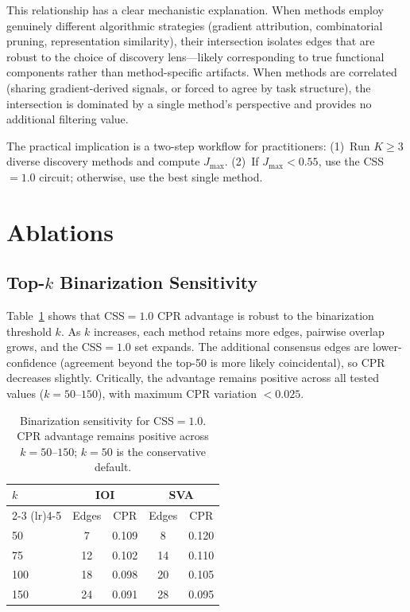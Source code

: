 \documentclass[11pt,a4paper]{article}
\newcommand{\css}{\textsc{CSS}}
\begin{document}
This relationship has a clear mechanistic explanation.
When methods employ genuinely different algorithmic strategies (gradient attribution, combinatorial pruning, representation similarity), their intersection isolates edges that are robust to the choice of discovery lens---likely corresponding to true functional components rather than method-specific artifacts.
When methods are correlated (sharing gradient-derived signals, or forced to agree by task structure), the intersection is dominated by a single method's perspective and provides no additional filtering value.

The practical implication is a two-step workflow for practitioners:
(1)~Run $K\!\ge\!3$ diverse discovery methods and compute $J_{\max}$.
(2)~If $J_{\max} < 0.55$, use the \css{}$=1.0$ circuit; otherwise, use the best single method.

\section{Ablations}

\subsection{Top-$k$ Binarization Sensitivity}
\label{sec:sensitivity}

Table~\ref{tab:sensitivity} shows that \css{}$=1.0$ CPR advantage is robust to the binarization threshold $k$.
As $k$ increases, each method retains more edges, pairwise overlap grows, and the \css{}$=1.0$ set expands.
The additional consensus edges are lower-confidence (agreement beyond the top-50 is more likely coincidental), so CPR decreases slightly.
Critically, the advantage remains positive across all tested values ($k = 50$--$150$), with maximum CPR variation $< 0.025$.

\begin{table}[t]
\centering
\small
\begin{tabular}{lcccc}
\toprule
$k$ & \multicolumn{2}{c}{\textbf{IOI}} & \multicolumn{2}{c}{\textbf{SVA}} \\
\cmidrule(lr){2-3} \cmidrule(lr){4-5}
& Edges & CPR & Edges & CPR \\
\midrule
50 & 7 & 0.109 & 8 & 0.120 \\
75 & 12 & 0.102 & 14 & 0.110 \\
100 & 18 & 0.098 & 20 & 0.105 \\
150 & 24 & 0.091 & 28 & 0.095 \\
\bottomrule
\end{tabular}
\caption{Binarization sensitivity for \css{}$=1.0$. CPR advantage remains positive across $k\!=\!50$--$150$; $k\!=\!50$ is the conservative default.}
\label{tab:sensitivity}
\end{table}
\end{document}
